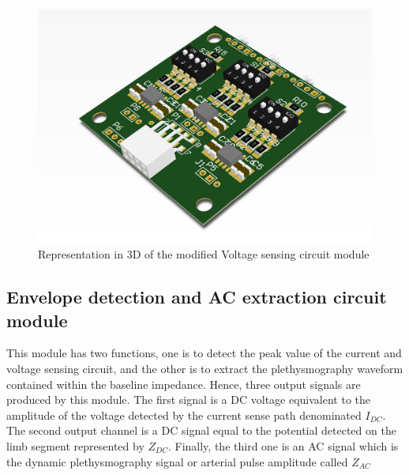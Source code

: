 \begin{figure}[!htpb]
	\centering
	\includegraphics[width=7.5 cm,keepaspectratio]{figure_Vsense}
	\caption{Representation in 3D of the modified Voltage sensing circuit module}
	\label{fig:voltage sense}
\end{figure}



%

\subsection{Envelope detection and AC extraction circuit module}
\label{section envelope}
This module has two functions, one is to detect the peak value of the current and voltage sensing circuit, and the other is to extract the plethysmography waveform contained within the baseline impedance. Hence, three output signals are produced by this module. The first signal is a DC voltage equivalent to the amplitude of the voltage detected by the current sense path denominated $I_{DC}$. The second output channel is a DC signal equal to the potential detected on the limb segment represented by $Z_{DC}$. Finally, the third one is an AC signal which is the dynamic plethysmography signal or arterial pulse amplitude called $Z_{AC}$

